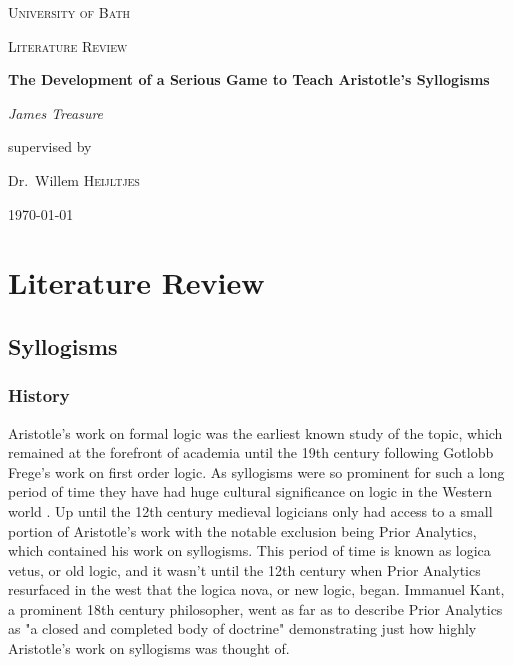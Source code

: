 \documentclass[12pt,a4paper]{report}
\begin{document}
\begin{titlepage}
	\centering
	{\scshape\LARGE University of Bath \par}
	\vspace{1cm}
	{\scshape\Large Literature Review\par}
	\vspace{1.5cm}
	{\huge\bfseries The Development of a Serious Game to Teach Aristotle's Syllogisms\par}
	\vspace{2cm}
	{\Large\itshape James Treasure\par}
	\vfill
	supervised by\par
	Dr.~Willem \textsc{Heijltjes}
	\vfill
	{\large \today\par}
\end{titlepage}

\tableofcontents
\chapter{Literature Review}
\section{Syllogisms}
\subsection{History}

Aristotle's work on formal logic was the earliest known study of the topic, which remained at the forefront of academia until the 19th century following Gotlobb Frege's work on first order logic. As syllogisms were so prominent for such a long period of time they have had huge cultural significance on logic in the Western world \citep{sep-aristotle-logic}. Up until the 12th century medieval logicians only had access to a small portion of Aristotle's work with the notable exclusion being Prior Analytics, which contained his work on syllogisms. This period of time is known as logica vetus, or old logic, and it wasn't until the 12th century when Prior Analytics resurfaced in the west that the logica nova, or new logic, began. Immanuel Kant, a prominent 18th century philosopher, went as far as to describe Prior Analytics as "a closed and completed body of doctrine" demonstrating just how highly Aristotle's work on syllogisms was thought of.
\end{document}
